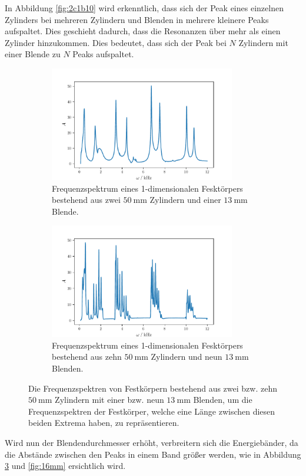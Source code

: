 In Abbildung \ref{fig:2c1b10} wird erkenntlich, dass sich der Peak eines einzelnen Zylinders bei mehreren Zylindern und Blenden in mehrere kleinere Peaks aufspaltet.
Dies geschieht dadurch, dass die Resonanzen über mehr als einen Zylinder hinzukommen. Dies bedeutet, dass sich der Peak bei $N$ Zylindern mit einer Blende zu 
$N$ Peaks aufspaltet.
\begin{figure}
    \begin{subfigure}{0.48\textwidth}%
    \centering%
    \includegraphics[height=5cm]{build/2c1b.pdf}%
    \caption{Frequenzspektrum eines 1-dimensionalen Fesktörpers bestehend aus zwei $\qty{50}{\milli\meter}$ Zylindern und einer $\qty{13}{\milli\meter}$ Blende.}%
    \label{fig:2c1b}%
    \end{subfigure}%
    \hfill%
    \begin{subfigure}{0.48\textwidth}%
    \centering%
    \includegraphics[height=5cm]{build/10c9b.pdf}%
    \caption{Frequenzspektrum eines 1-dimensionalen Fesktörpers bestehend aus zehn $\qty{50}{\milli\meter}$ Zylindern und neun $\qty{13}{\milli\meter}$ Blenden.}%
    \label{fig:2c1b}%
    \end{subfigure}%
    \caption{Die Frequenzspektren von Festkörpern bestehend aus zwei bzw. zehn $\qty{50}{\milli\meter}$ Zylindern mit einer bzw. neun $\qty{13}{\milli\meter}$ Blenden, um die 
    Frequenzspektren der Festkörper, welche eine Länge zwischen diesen beiden Extrema haben, zu repräsentieren.}%
    \label{fig:13mm}
\end{figure}%
Wird nun der Blendendurchmesser erhöht, verbreitern sich die Energiebänder, da die Abstände zwischen den Peaks in einem Band größer werden, 
wie in Abbildung \ref{fig:13mm} und \ref{fig:16mm} ersichtlich wird.
\FloatBarrier

